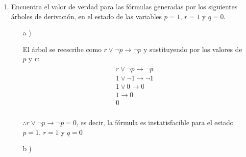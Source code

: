 \documentclass[11pt,letterpaper]{article}
\begin{document}
\begin{enumerate}
    \item Encuentra el valor de verdad para las fórmulas generadas por los
    siguientes árboles de derivación, en el estado de las variables $p = 1$,
    $r = 1$ y $q = 0$. \\
    \begin{enumerate}
        \item [a])\\

            El árbol se reescribe como $r \lor \neg p \to \neg p$ y sustituyendo
            por los valores de $p$ y $r$:
                \begin{equation}
                \begin{split}
                \begin{aligned}
                    r \lor \neg p \to \neg p \\
                    1 \lor \neg 1 \to \neg 1 \\
                    1 \lor 0 \to 0 \\
                    1 \to 0 \\
                    0 \\
                \end{aligned}
                \end{split}
                \end{equation}

            $\therefore r \lor \neg p \to \neg p = 0$, es decir, la fórmula es instatisfacible
                    para el estado $p = 1$, $r = 1$ y $q = 0$
    \clearpage
    \item [b])\\


\end{enumerate}
\end{enumerate}
\end{document}
